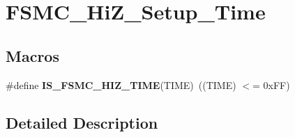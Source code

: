 \hypertarget{group___f_s_m_c___hi_z___setup___time}{\section{F\-S\-M\-C\-\_\-\-Hi\-Z\-\_\-\-Setup\-\_\-\-Time}
\label{group___f_s_m_c___hi_z___setup___time}
}
\subsection*{Macros}
\begin{DoxyCompactItemize}
\item 
\hypertarget{group___f_s_m_c___hi_z___setup___time_gaeb6295e8cc1a524f060c5e780f868033}{\#define {\bfseries I\-S\-\_\-\-F\-S\-M\-C\-\_\-\-H\-I\-Z\-\_\-\-T\-I\-M\-E}(T\-I\-M\-E)~((T\-I\-M\-E) $<$= 0x\-F\-F)}\label{group___f_s_m_c___hi_z___setup___time_gaeb6295e8cc1a524f060c5e780f868033}

\end{DoxyCompactItemize}


\subsection{Detailed Description}
